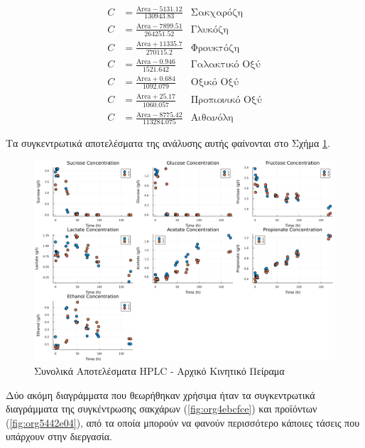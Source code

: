 \documentclass[11pt]{report}
\begin{document}
\begin{enumerate}
\begin{subequations}
\label{eqn:hplc-calibration}
\begin{align}
C &= \frac{\text{Area} - 5131.12}{130943.83} & \text{Σακχαρόζη} \label{eqn:hplc-sucrose} \\
C &= \frac{\text{Area} - 7899.51}{264251.52} & \text{Γλυκόζη} \label{eqn:hplc-glucose} \\
C &= \frac{\text{Area} + 11335.7}{270115.2} & \text{Φρουκτόζη} \label{eqn:hplc-fructose} \\
C &= \frac{\text{Area} - 0.946}{1521.642} & \text{Γαλακτικό Οξύ} \label{eqn:hplc-lactate} \\
C &= \frac{\text{Area} + 0.684}{1092.079} & \text{Οξικό Οξύ} \label{eqn:hplc-acetate} \\
C &= \frac{\text{Area} + 25.17}{1060.057} & \text{Προπιονικό Οξύ} \label{eqn:hplc-propionate} \\
C &= \frac{\text{Area} - 8775.42}{113284.075} & \text{Αιθανόλη} \label{eqn:hplc-ethanol}
\end{align}
\end{subequations}

Τα συγκεντρωτικά αποτελέσματα της ανάλυσης αυτής φαίνονται στο Σχήμα \ref{fig:org74aaf73}. 

\begin{figure}[htbp]
\centering
\includegraphics[width=.9\linewidth]{../plots/23_10/final_scatter_23_10.png}
\caption{\label{fig:org74aaf73}Συνολικά Αποτελέσματα HPLC - Αρχικό Κινητικό Πείραμα}
\end{figure}

Δύο ακόμη διαγράμματα που θεωρήθηκαν χρήσιμα ήταν τα συγκεντρωτικά διαγράμματα της συγκέντρωσης σακχάρων (\ref{fig:org4ebcfce}) και προϊόντων (\ref{fig:org5442e04}), από τα οποία μπορούν να φανούν περισσότερο κάποιες τάσεις που υπάρχουν στην διεργασία.


\end{enumerate}
\end{document}
